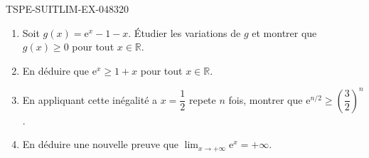 \begin{exercice}{TSPE-SUITLIM-EX-048}{3}{20}
\begin{enumerate}
  \item Soit $g(x) = \mathrm{e}^x - 1 - x$. Étudier les variations de $g$ et montrer que $g(x) \geq 0$ pour tout $x \in \mathbb{R}$.
  \item En déduire que $\mathrm{e}^x \geq 1 + x$ pour tout $x \in \mathbb{R}$.
  \item En appliquant cette inégalité a $x = \dfrac{1}{2}$ repete $n$ fois, montrer que $\mathrm{e}^{n/2} \geq \left(\dfrac{3}{2}\right)^n$.
  \item En déduire une nouvelle preuve que $\lim_{x \to +\infty} \mathrm{e}^x = +\infty$.
\end{enumerate}
\end{exercice}
